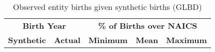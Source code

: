 \begin{table}[H]\label{tab:GLBD:Probability}
\centering\footnotesize
\caption{Observed entity births given synthetic births (GLBD)} \label{ProbabilityManufacturing} \medskip
\renewcommand{\arraystretch}{1}
\begin{tabular}{c c| c c c}
\toprule
\multicolumn{2}{c|}{\textbf{Birth Year}} &  \multicolumn{3}{c}{\textbf{\% of Births over NAICS}}\\
\textbf{Synthetic}&\textbf{Actual}&\textbf{Minimum}&\textbf{Mean}&\textbf{Maximum}\\
\midrule

\bottomrule
\end{tabular} 
\\
\justify
\end{table}

